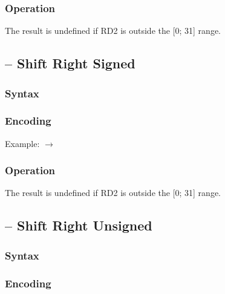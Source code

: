 \documentclass[a4paper,12pt,twoside,extrafontsizes]{memoir}
\begin{document}
{\subsubsection{Operation}


The result is undefined if RD2 is outside the [0; 31] range.

\subsection{ -- Shift Right Signed}
\label{subsec:instr:srs}

\subsubsection{Syntax}


\subsubsection{Encoding}


Example:  $\rightarrow$ 

\subsubsection{Operation}


The result is undefined if RD2 is outside the [0; 31] range.

\subsection{ -- Shift Right Unsigned}
\label{subsec:instr:sru}

\subsubsection{Syntax}


\subsubsection{Encoding}


}
\end{document}
